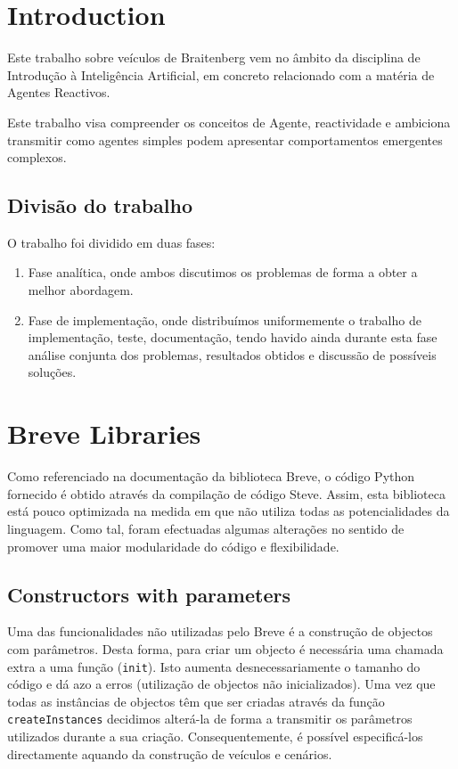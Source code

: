 \documentclass[a4paper]{article}
\title{\documentTitle}
\author{\documentAuthors{}}
\begin{document}
\renewcommand{\figurename}{Figure}
\maketitle
\cleardoublepage

\tableofcontents
\cleardoublepage

\setlength{\parindent}{1cm}
\setlength{\parskip}{0.3cm}

\section{Introduction}
\indent \indent Este trabalho sobre veículos de Braitenberg vem no âmbito da disciplina de Introdução à Inteligência Artificial, em concreto relacionado com a matéria de Agentes Reactivos.

Este trabalho visa compreender os conceitos de Agente, reactividade e ambiciona transmitir como agentes simples podem apresentar comportamentos emergentes complexos.

\subsection{Divisão do trabalho}
O trabalho foi dividido em duas fases:
\begin{enumerate}
	\item Fase analítica, onde ambos discutimos os problemas de forma a obter a melhor abordagem.
	\item Fase de implementação, onde distribuímos uniformemente o trabalho de implementação, teste, documentação, tendo havido ainda durante esta fase análise conjunta dos problemas, resultados obtidos e discussão de possíveis soluções.
\end{enumerate}

\cleardoublepage
\section{Breve Libraries}
\indent \indent Como referenciado na documentação da biblioteca Breve, o código Python fornecido é obtido através da compilação de código Steve.
Assim, esta biblioteca está pouco optimizada na medida em que não utiliza todas as potencialidades da linguagem.
Como tal, foram efectuadas algumas alterações no sentido de promover uma maior modularidade do código e flexibilidade.

\cleardoublepage

\subsection{Constructors with parameters}
\indent \indent Uma das funcionalidades não utilizadas pelo Breve é a construção de objectos com parâmetros.
Desta forma, para criar um objecto é necessária uma chamada extra a uma função (\texttt{init}).
Isto aumenta desnecessariamente o tamanho do código e dá azo a erros (utilização de objectos não inicializados).
Uma vez que todas as instâncias de objectos têm que ser criadas através da função \texttt{createInstances} decidimos alterá-la de forma a transmitir os parâmetros utilizados durante a sua criação.
Consequentemente, é possível especificá-los directamente aquando da construção de veículos e cenários.
\end{document}
